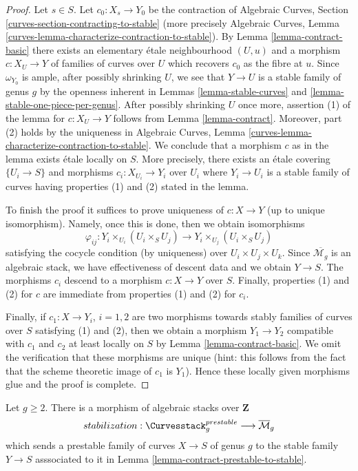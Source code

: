 \begin{proof}
Let $s \in S$. Let $c_0 : X_s \to Y_0$ be the contraction of
Algebraic Curves, Section \ref{curves-section-contracting-to-stable}
(more precisely Algebraic Curves, Lemma
\ref{curves-lemma-characterize-contraction-to-stable}).
By Lemma \ref{lemma-contract-basic}
there exists an elementary \'etale neighbourhood
$(U, u)$ and a morphism $c : X_U \to Y$
of families of curves over $U$ which recovers
$c_0$ as the fibre at $u$.
Since $\omega_{Y_0}$ is ample, after possibly shrinking $U$,
we see that $Y \to U$ is a stable family of genus $g$
by the openness inherent in
Lemmas \ref{lemma-stable-curves} and \ref{lemma-stable-one-piece-per-genus}.
After possibly shrinking $U$ once more, assertion (1) of the lemma for
$c : X_U \to Y$ follows from Lemma \ref{lemma-contract}.
Moreover, part (2) holds by the uniqueness in Algebraic Curves, Lemma
\ref{curves-lemma-characterize-contraction-to-stable}.
We conclude that a morphism $c$ as in the lemma exists \'etale locally
on $S$. More precisely, there exists an \'etale covering
$\{U_i \to S\}$ and morphisms $c_i : X_{U_i} \to Y_i$ over $U_i$
where $Y_i \to U_i$ is a stable family of curves
having properties (1) and (2) stated in the lemma.

\medskip\noindent
To finish the proof it suffices to prove uniqueness of $c : X \to Y$
(up to unique isomorphism). Namely, once this is done, then we
obtain isomorphisms
$$
\varphi_{ij} :
Y_i \times_{U_i} (U_i \times_S U_j)
\longrightarrow
Y_i \times_{U_j} (U_i \times_S U_j)
$$
satisfying the cocycle condition (by uniqueness) over
$U_i \times U_j \times U_k$. Since $\overline{\mathcal{M}_g}$
is an algebraic stack, we have effectiveness of descent data
and we obtain $Y \to S$. The morphisms $c_i$ descend to a morphism
$c : X \to Y$ over $S$. Finally, properties (1) and (2) for $c$
are immediate from properties (1) and (2) for $c_i$.

\medskip\noindent
Finally, if $c_1 : X \to Y_i$, $i = 1, 2$ are two morphisms towards
stably families of curves over $S$ satisfying (1) and (2), then
we obtain a morphism $Y_1 \to Y_2$ compatible with $c_1$ and $c_2$
at least locally on $S$ by Lemma \ref{lemma-contract-basic}.
We omit the verification that these morphisms are unique
(hint: this follows from the fact that the scheme theoretic image
of $c_1$ is $Y_1$). Hence these locally given morphisms glue
and the proof is complete.
\end{proof}

\begin{lemma}
\label{lemma-stabilization-morphism}
Let $g \geq 2$. There is a morphism of algebraic stacks over $\mathbf{Z}$
$$
stabilization :
\Curvesstack^{prestable}_g
\longrightarrow
\overline{\mathcal{M}}_g
$$
which sends a prestable family of curves $X \to S$ of genus $g$
to the stable family $Y \to S$ asssociated to it in
Lemma \ref{lemma-contract-prestable-to-stable}.
\end{lemma}

